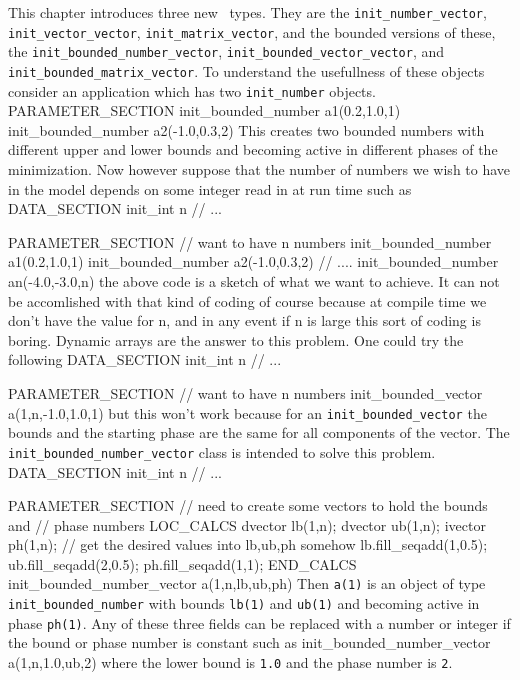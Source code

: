 This chapter introduces three new \ADM\ types. They are
the {\tt init\_number\_vector}, {\tt init\_vector\_vector}, 
{\tt init\_matrix\_vector}, and the bounded versions of these,
the {\tt init\_bounded\_number\_vector}, {\tt init\_bounded\_vector\_vector}, 
and {\tt init\_bounded\_matrix\_vector}.
To understand the usefullness of these objects consider an application
which has two {\tt init\_number} objects.
\beginexample
PARAMETER_SECTION
  init_bounded_number a1(0.2,1.0,1)
  init_bounded_number a2(-1.0,0.3,2)
\endexample 
\noindent This creates two bounded numbers with different
upper and lower bounds and becoming active in different phases
of the minimization.
Now however suppose that the number of numbers we wish to
have in the model depends on some integer read in at run time such as
\beginexample
DATA_SECTION
  init_int n
 //  ...

PARAMETER_SECTION
  // want to have n numbers
  init_bounded_number a1(0.2,1.0,1)
  init_bounded_number a2(-1.0,0.3,2)
  // ....
  init_bounded_number an(-4.0,-3.0,n)
\endexample 
\noindent the above code is a sketch of what we want to 
achieve. It can not be accomlished with that kind of coding
of course because at compile time we don't have the value for n,
and in any event if n is large this sort of coding is boring.
Dynamic arrays are the answer to this problem. One could try
the following
\beginexample
DATA_SECTION
  init_int n
 //  ...

PARAMETER_SECTION
  // want to have n numbers
  init_bounded_vector a(1,n,-1.0,1.0,1)
\endexample 
\noindent but this won't work because for an {\tt init\_bounded\_vector}
the bounds and the starting phase are the same for all components of
the vector. The {\tt init\_bounded\_number\_vector} class
is intended to solve this problem.
\beginexample
DATA_SECTION
  init_int n
 //  ...

PARAMETER_SECTION
  // need to create some vectors to hold the bounds and
  // phase numbers
 LOC_CALCS
  dvector lb(1,n); 
  dvector ub(1,n); 
  ivector ph(1,n); 
  // get the desired values into lb,ub,ph somehow 
  lb.fill_seqadd(1,0.5);
  ub.fill_seqadd(2,0.5);
  ph.fill_seqadd(1,1);
 END_CALCS
  init_bounded_number_vector a(1,n,lb,ub,ph)
\endexample 
\noindent Then {\tt a(1)} is an object of type
{\tt init\_bounded\_number} with bounds {\tt lb(1)} and 
{\tt ub(1)} and becoming active in phase {\tt ph(1)}. 
Any of these three fields can be replaced with a number or
integer if the bound or phase number is constant such as
\beginexample
  init_bounded_number_vector a(1,n,1.0,ub,2)
\endexample 
\noindent where the lower bound is {\tt 1.0} and the
phase number is {\tt 2}.


